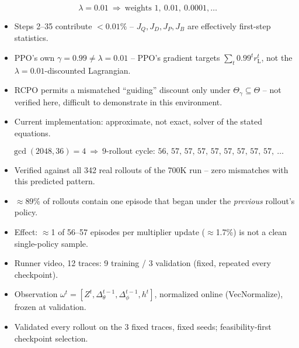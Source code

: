 \documentclass[aspectratio=169]{beamer}
\begin{document}
\begin{frame}
\[
\lambda=0.01 \ \Rightarrow\ \text{weights } 1,\ 0.01,\ 0.0001,\ldots
\]
\begin{itemize}
  \item Steps 2--35 contribute $<0.01\%$ -- $J_Q,J_D,J_P,J_B$ are effectively first-step statistics.
  \item PPO's own $\gamma=0.99\ne\lambda=0.01$ -- PPO's gradient targets $\sum_t 0.99^t r_{\mathrm L}^t$, not the $\lambda=0.01$-discounted Lagrangian.
  \item RCPO permits a mismatched ``guiding'' discount only under $\Theta_\gamma\subseteq\Theta$ \cite{tessler18} -- not verified here, difficult to demonstrate in this environment.
  \item Current implementation: approximate, not exact, solver of the stated equations.
\end{itemize}
\end{frame}

\begin{frame}
\[
\gcd(2048,36)=4 \ \Rightarrow\ \text{9-rollout cycle: } 56,\,57,\,57,\,57,\,57,\,57,\,57,\,57,\,57,\ \ldots
\]
\begin{itemize}
  \item Verified against all 342 real rollouts of the 700K run -- zero mismatches with this predicted pattern.
  \item $\approx$89\% of rollouts contain one episode that began under the \emph{previous} rollout's policy.
  \item Effect: $\approx$1 of 56--57 episodes per multiplier update ($\approx$1.7\%) is not a clean single-policy sample.
\end{itemize}
\end{frame}

\begin{frame}
\begin{itemize}
  \item Runner video, 12 traces: 9 training / 3 validation (fixed, repeated every checkpoint).
  \item Observation $\omega^t=[Z^t,\Delta_\theta^{t-1},\Delta_\phi^{t-1},h^t]$, normalized online (VecNormalize), frozen at validation.
  \item Validated every rollout on the 3 fixed traces, fixed seeds; feasibility-first checkpoint selection.
\end{itemize}
\end{frame}
\end{document}
